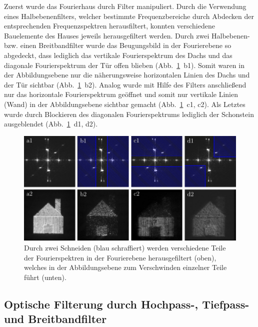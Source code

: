  Zuerst wurde das Fourierhaus durch Filter manipuliert. Durch die Verwendung eines Halbebenenfilters, welcher bestimmte Frequenzbereiche durch Abdecken der entsprechenden Frequenzspektren herausfiltert, konnten verschiedene Bauelemente des Hauses jeweils herausgefiltert werden. Durch zwei Halbebenen- bzw. einen Breitbandfilter wurde das Beugungsbild in der Fourierebene so abgedeckt, dass lediglich das vertikale Fourierspektrum des Dachs und das diagonale Fourierspektrum der Tür offen blieben (Abb.~\ref{fig:fourierhaus_mit_filtern}~b1). Somit waren in der Abbildungsebene nur die näherungsweise horizontalen Linien des Dachs und der Tür sichtbar (Abb.~\ref{fig:fourierhaus_mit_filtern}~b2). Analog wurde mit Hilfe des Filters anschließend nur das horizontale Fourierspektrum geöffnet und somit nur vertikale Linien (Wand) in der Abbildungsebene sichtbar gemacht (Abb.~\ref{fig:fourierhaus_mit_filtern}~c1, c2). Als Letztes wurde durch Blockieren des diagonalen Fourierspektrums lediglich der Schonstein ausgeblendet (Abb.~\ref{fig:fourierhaus_mit_filtern}~d1, d2).

\begin{figure}[h]
	\centering
	\includegraphics[scale=1]{images/Regina/abb21.pdf}
	
	\caption[Fourierhaus mit verschiedenen Filtern]{
		Durch zwei Schneiden (blau schraffiert) werden verschiedene Teile der Fourierspektren in der Fourierebene herausgefiltert (oben), welches in der Abbildungsebene zum Verschwinden einzelner Teile führt (unten).
	}
	\label{fig:fourierhaus_mit_filtern}
\end{figure}

\subsection{Optische Filterung durch Hochpass-, Tiefpass- und Breitbandfilter}


